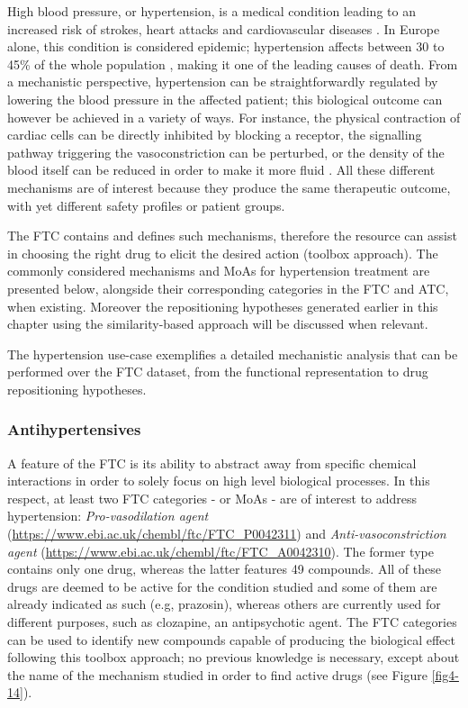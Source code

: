 High blood pressure, or hypertension, is a medical condition leading to an increased risk of strokes, heart attacks and cardiovascular diseases \citep{law2003lowering}. In Europe alone, this condition is considered epidemic; hypertension affects between 30 to 45\% of the whole population \citep{swedberg2005task}, making it one of the leading causes of death. From a mechanistic perspective, hypertension can be straightforwardly regulated by lowering the blood pressure in the affected patient; this biological outcome can however be achieved in a variety of ways. For instance, the physical contraction of cardiac cells can be directly inhibited by blocking a receptor, the signalling pathway triggering the vasoconstriction can be perturbed, or the density of the blood itself can be reduced in order to make it more fluid \citep{swedberg2005task}. All these different mechanisms are of interest because they produce the same therapeutic outcome, with yet different safety profiles or patient groups.

The FTC contains and defines such mechanisms, therefore the resource can assist in choosing the right drug to elicit the desired action (toolbox approach). The commonly considered mechanisms and MoAs for hypertension treatment are presented below, alongside their corresponding categories in the FTC and ATC, when existing. Moreover the repositioning hypotheses generated earlier in this chapter using the similarity-based approach will be discussed when relevant.

The hypertension use-case exemplifies a detailed mechanistic analysis that can be performed over the FTC dataset, from the functional representation to drug repositioning hypotheses.

\subsubsection{Antihypertensives}
A feature of the FTC is its ability to abstract away from specific chemical interactions in order to solely focus on high level biological processes. In this respect, at least two FTC categories - or MoAs - are of interest to address hypertension: \emph{Pro-vasodilation agent} (\url{https://www.ebi.ac.uk/chembl/ftc/FTC\_P0042311}) and \emph{Anti-vasoconstriction agent} (\url{https://www.ebi.ac.uk/chembl/ftc/FTC\_A0042310}). The former type contains only one drug, whereas the latter features 49 compounds. All of these drugs are deemed to be active for the condition studied and some of them are already indicated as such (e.g, prazosin), whereas others are currently used for different purposes, such as clozapine, an antipsychotic agent. The FTC categories can be used to identify new compounds capable of producing the biological effect following this toolbox approach; no previous knowledge is necessary, except about the name of the mechanism studied in order to find active drugs (see Figure \ref{fig4-14}).

